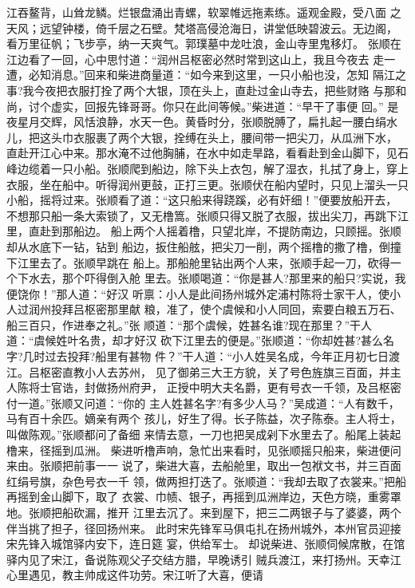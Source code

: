 江吞鳌背，山耸龙鳞。烂银盘涌出青螺，软翠帷远拖素练。遥观金殿，受八面
之天风；远望钟楼，倚千层之石壁。梵塔高侵沧海日，讲堂低映碧波云。无边阁，
看万里征帆；飞步亭，纳一天爽气。郭璞墓中龙吐浪，金山寺里鬼移灯。
张顺在江边看了一回，心中思忖道：“润州吕枢密必然时常到这山上，我且今夜去
走一遭，必知消息。”回来和柴进商量道：“如今来到这里，一只小船也没，怎知
隔江之事?我今夜把衣服打拴了两个大银，顶在头上，直赴过金山寺去，把些财赂
与那和尚，讨个虚实，回报先锋哥哥。你只在此间等候。”柴进道：“早干了事便
回。”
是夜星月交辉，风恬浪静，水天一色。黄昏时分，张顺脱膊了，扁扎起一腰白绢水
儿，把这头巾衣服裹了两个大银，拴缚在头上，腰间带一把尖刀，从瓜洲下水，
直赴开江心中来。那水淹不过他胸脯，在水中如走旱路，看看赴到金山脚下，见石
峰边缆着一只小船。张顺爬到船边，除下头上衣包，解了湿衣，扎拭了身上，穿上
衣服，坐在船中。听得润州更鼓，正打三更。张顺伏在船内望时，只见上溜头一只
小船，摇将过来。张顺看了道：“这只船来得跷蹊，必有奸细！”便要放船开去，
不想那只船一条大索锁了，又无橹篙。张顺只得又脱了衣服，拔出尖刀，再跳下江
里，直赴到那船边。
船上两个人摇着橹，只望北岸，不提防南边，只顾摇。张顺却从水底下一钻，钻到
船边，扳住船舷，把尖刀一削，两个摇橹的撒了橹，倒撞下江里去了。张顺早跳在
船上。那船舱里钻出两个人来，张顺手起一刀，砍得一个下水去，那个吓得倒入舱
里去。张顺喝道：“你是甚人?那里来的船只?实说，我便饶你！”那人道：“好汉
听禀：小人是此间扬州城外定浦村陈将士家干人，使小人过润州投拜吕枢密那里献
粮，准了，使个虞候和小人同回，索要白粮五万石、船三百只，作进奉之礼。”张
顺道：“那个虞候，姓甚名谁?现在那里？”干人道：“虞候姓叶名贵，却才好汉
砍下江里去的便是。”张顺道：“你却姓甚?甚么名字?几时过去投拜?船里有甚物
件？”干人道：“小人姓吴名成，今年正月初七日渡江。吕枢密直教小人去苏州，
见了御弟三大王方貌，关了号色旌旗三百面，并主人陈将士官诰，封做扬州府尹，
正授中明大夫名爵，更有号衣一千领，及吕枢密付一道。”张顺又问道：“你的
主人姓甚名字?有多少人马？”吴成道：“人有数千，马有百十余匹。嫡亲有两个
孩儿，好生了得。长子陈益，次子陈泰。主人将士，叫做陈观。”张顺都问了备细
来情去意，一刀也把吴成剁下水里去了。船尾上装起橹来，径摇到瓜洲。
柴进听橹声响，急忙出来看时，见张顺摇只船来，柴进便问来由。张顺把前事一一
说了，柴进大喜，去船舱里，取出一包袱文书，并三百面红绢号旗，杂色号衣一千
领，做两担打迭了。张顺道：“我却去取了衣裳来。”把船再摇到金山脚下，取了
衣裳、巾帻、银子，再摇到瓜洲岸边，天色方晓，重雾罩地。张顺把船砍漏，推开
江里去沉了。来到屋下，把三二两银子与了婆婆，两个伴当挑了担子，径回扬州来。
此时宋先锋军马俱屯扎在扬州城外，本州官员迎接宋先锋入城馆驿内安下，连日筵
宴，供给军士。
却说柴进、张顺伺候席散，在馆驿内见了宋江，备说陈观父子交结方腊，早晚诱引
贼兵渡江，来打扬州。天幸江心里遇见，教主帅成这件功劳。宋江听了大喜，便请
